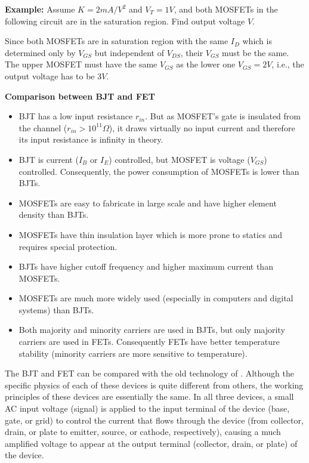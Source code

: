 \documentclass{article}
\begin{document}
{\bf Example:} Assume $K=2 mA/V^2$ and $V_T=1V$, and both MOSFETs in the
following circuit are in the saturation region. Find output voltage $V$.


Since both MOSFETs are in saturation region with the same $I_D$ which is
determined only by $V_{GS}$ but independent of $V_{DS}$, their $V_{GS}$ must 
be the same. The upper MOSFET must have the same $V_{GS}$ as the lower one 
$V_{GS}=2V$, i.e., the output voltage has to be $3V$.

{\bf Comparison between BJT and FET}

\begin{itemize}
\item BJT has a low input resistance $r_{in}$. But as MOSFET's gate is
  insulated from the channel ($r_{in}>10^{11} \Omega$), it draws virtually
  no input current and therefore its input resistance is infinity in theory.
\item BJT is current ($I_B$ or $I_E$) controlled, but MOSFET is voltage 
  ($V_{GS}$) controlled. Consequently, the power consumption of MOSFETs 
  is lower than BJTs.
\item MOSFETs are easy to fabricate in large scale and have higher element
  density than BJTs.
\item MOSFETs have thin insulation layer which is more prone to statics
  and requires special protection. 
\item BJTs have higher cutoff frequency and higher maximum current than 
  MOSFETs.
\item MOSFETs are much more widely used (especially in computers and 
  digital systems) than BJTs.
\item Both majority and minority carriers are used in BJTs, but only 
  majority carriers are used in FETs. Consequently FETs have better
  temperature stability (minority carriers are more sensitive to
  temperature).
  
\end{itemize}

The BJT and FET can be compared with the old technology of 
.
Although the specific physics of each of these devices is quite different 
from others, the working principles of these devices are essentially the 
same. In all three devices, a small AC input voltage (signal) is applied
to the input terminal of the device (base, gate, or grid) to control the
current that flows through the device (from collector, drain, or plate to 
emitter, source, or cathode, respectively), causing a much amplified voltage
to appear at the output terminal (collector, drain, or plate) of the device.
\end{document}
